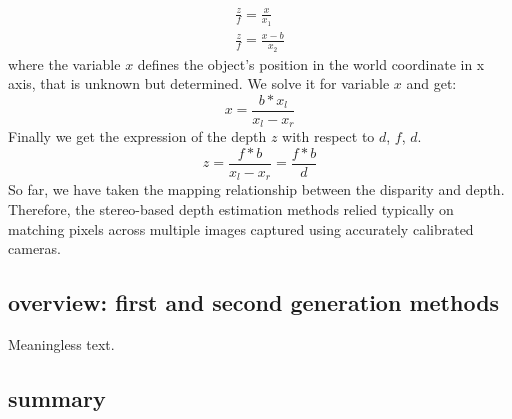 \begin{gather}
\label{}
    \frac{z}{f} =  \frac{x}{x_1} \\
    \frac{z}{f} =  \frac{x-b}{x_2}
\end{gather}
where the variable $x$ defines the object's position in the world coordinate in x axis, that is unknown but determined. We solve it for variable $x$ and get: 
\begin{equation}
    x = \frac{b*x_l}{x_l-x_r}
\end{equation}
Finally we get the expression of the depth $z$ with respect to $d$, $f$, $d$.
\begin{equation}
    z = \frac{f*b}{x_l-x_r} = \frac{f*b}{d}
\end{equation}
So far, we have taken the mapping relationship between the disparity and depth. Therefore, the stereo-based depth estimation
methods relied typically on matching pixels across multiple images captured using accurately calibrated cameras. 















\subsection{overview: first and second generation methods}
\label{overview: first and second generation methods}
Meaningless text.

\subsection{summary}


